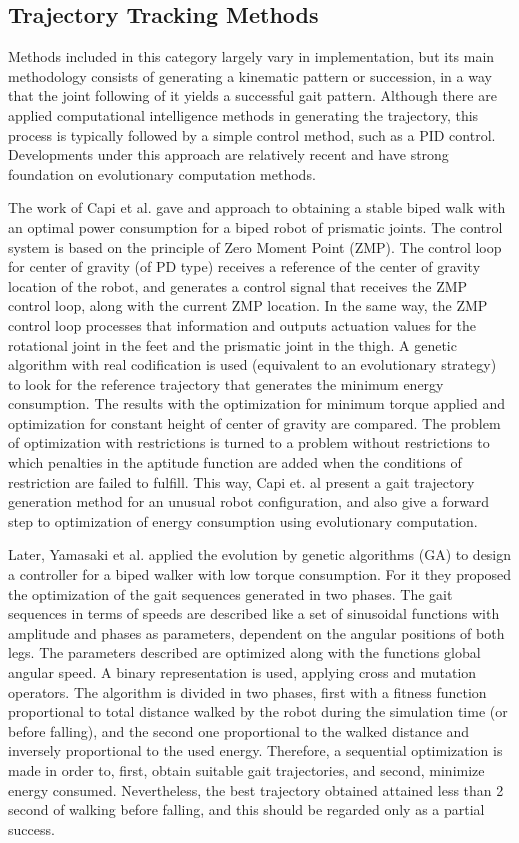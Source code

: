 \subsection{Trajectory Tracking Methods}
Methods included in this category largely vary in implementation, but its main methodology consists of generating a kinematic pattern or succession, in a way that the joint following of it yields a successful gait pattern. Although there are applied computational intelligence methods in generating the trajectory, this process is typically followed by a simple control method, such as a PID control. Developments under this approach are relatively recent and have strong foundation on evolutionary computation methods.


The work of Capi et al. \cite{Capi02Optimal} gave and approach to obtaining a stable biped walk with an optimal power consumption for a biped robot of prismatic joints. The control system is based on the principle of Zero Moment Point (ZMP). The control loop for center of gravity (of PD type) receives a reference of the center of gravity location of the robot, and generates a control signal that receives the ZMP control loop, along with the current ZMP location. In the same way, the ZMP control loop processes that information and outputs actuation values for the rotational joint in the feet and the prismatic joint in the thigh. A genetic algorithm with real codification is used (equivalent to an evolutionary strategy) to look for the reference trajectory that generates the minimum energy consumption. The results with the optimization for minimum torque applied and optimization for constant height of center of gravity are compared. The problem of optimization with restrictions is turned to a problem without restrictions to which penalties in the aptitude function are added when the conditions of restriction are failed to fulfill. This way, Capi et. al present a gait trajectory generation method for an unusual robot configuration, and also give a forward step to optimization of energy consumption using evolutionary computation.


Later, Yamasaki et al. \cite{Yamasaki03Control} applied the evolution by genetic algorithms (GA) to design a controller for a biped walker with low torque consumption. For it they proposed the optimization of the gait sequences generated in two phases. The gait sequences in terms of speeds are described like a set of sinusoidal functions with amplitude and phases as parameters, dependent on the angular positions of both legs. The parameters described are optimized along with the functions global angular speed. A binary representation is used, applying cross and mutation operators. The algorithm is divided in two phases, first with a fitness function proportional to total distance walked by the robot during the simulation time (or before falling), and the second one proportional to the walked distance and inversely proportional to the used energy. Therefore, a sequential optimization is made in order to, first, obtain suitable gait trajectories, and second, minimize energy consumed. Nevertheless, the best trajectory obtained attained less than 2 second of walking before falling, and this should be regarded only as a partial success. 


